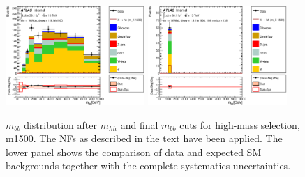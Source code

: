 \begin{figure}
\begin{center}
\includegraphics*[width=0.47\textwidth] {figures/Unblinded_mbb/C_reOpt2000_bbpt350_wwpt250_drww15_hh1500_bbMass_regionA_met25d020.eps}
\includegraphics*[width=0.47\textwidth] {figures/Unblinded_mbb/C_reOpt2000_bbpt350_wwpt250_drww15_hh1500_mbb_bbMass_regionA_met25d020.eps}
\caption[$m_{bb}$ distribution after $m_{hh}$ and final $m_{bb}$ cuts for high-mass selection, m1500.]{$m_{bb}$ distribution after $m_{hh}$ and final $m_{bb}$ cuts for high-mass selection, m1500. The NFs as described in the text have been applied. The lower panel shows the comparison of data and expected SM backgrounds together with the complete systematics uncertainties.}
\end{center}
\end{figure}

